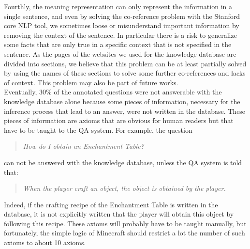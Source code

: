 \documentclass[12pt]{article}
\begin{document}
Fourthly, the meaning representation can only represent the information in a single sentence, and even by solving the co-reference problem with the Stanford core NLP tool, we sometimes loose or misunderstand important information by removing the context of the sentence. In particular there is a risk to generalize some facts that are only true in a specific context that is not specified in the sentence. As the pages of the websites we used for the knowledge database are divided into sections, we believe that this problem can be at least partially solved by using the names of these sections to solve some further co-references and lacks of context. This problem may also be part of future works.\\
Eventually, 30\% of the annotated questions were not answerable with the knowledge database alone because some pieces of information, necessary for the inference process that lead to an answer, were not written in the database. These pieces of information are axioms that are obvious for human readers but that have to be taught to the QA system. For example, the question
\begin{quote}
\textit{How do I obtain an Enchantment Table?}
\end{quote}
can not be answered with the knowledge database, unless the QA system is told that:
\begin{quote}
\textit{When the player craft an object, the object is obtained by the player.}
\end{quote}
Indeed, if the crafting recipe of the Enchantment Table is written in the database, it is not explicitly written that the player will obtain this object by following this recipe.
These axioms will probably have to be taught manually, but fortunately, the simple logic of Minecraft should restrict a lot the number of such axioms to about 10 axioms.
\end{document}
